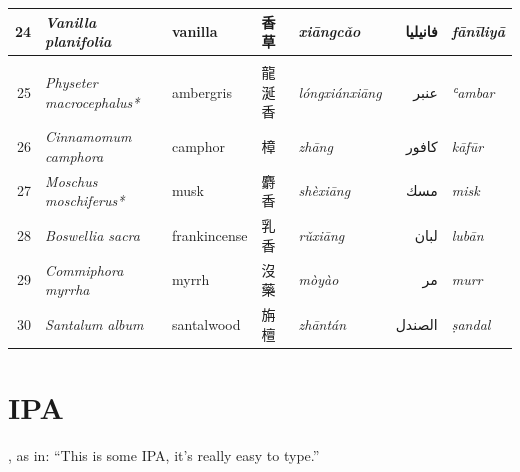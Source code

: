 \begin{table}[ht]
\begin{tabularx}{\textwidth}{@{}r>{\footnotesize}llll@{}rl@{}}
24          & \textit{Vanilla planifolia}        & vanilla          & 香草               & \textit{xiāngcǎo}        & فانيليا         & \textit{fānīliyā}\\ 
\midrule
 & & & & & & \\ \midrule
25          & \textit{Physeter macrocephalus*} & ambergris        & 龍涎香              & \textit{lóngxiánxiāng}   & عنبر            & \textit{ʿambar}          \\
26          & \textit{Cinnamomum camphora}     & camphor          & 樟                & \textit{zhāng}           & كافور           & \textit{kāfūr}           \\
27          & \textit{Moschus moschiferus*}    & musk             & 麝香               & \textit{shèxiāng}        & مسك             & \textit{misk}            \\
28          & \textit{Boswellia sacra}         & frankincense     & 乳香               & \textit{rǔxiāng}         & لبان            & \textit{lubān}           \\
29          & \textit{Commiphora myrrha}       & myrrh            & 沒藥               & \textit{mòyào}           & مر              & \textit{murr}            \\
30          & \textit{Santalum album}          & santalwood       & 旃檀               & \textit{zhāntán}         & الصندل          & \textit{ṣandal}          \\ 
\bottomrule
\end{tabularx}
\label{table:set}
\end{table}

\setlength{\tabcolsep}{6pt} %

\section{IPA}

\textipa{[ðIsIzsAmaIpeI]},  as in: ``This is some IPA, it's really easy to type.''

